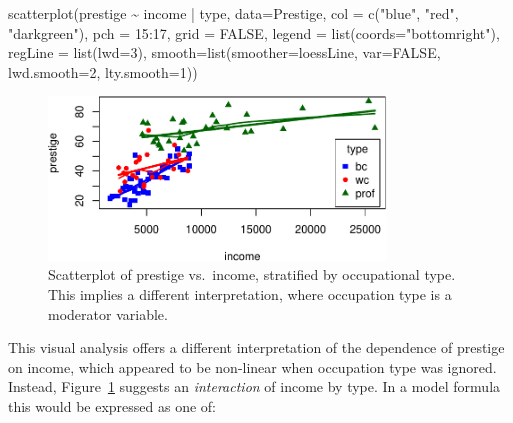 \documentclass[
  letterpaper,
  10pt,
  krantz2]{krantz}
\makeatletter
\newenvironment{Shaded}{\begin{snugshade}}{\end{snugshade}}
\newcommand{\AttributeTok}[1]{\textcolor[rgb]{0.40,0.45,0.13}{#1}}
\newcommand{\ConstantTok}[1]{\textcolor[rgb]{0.56,0.35,0.01}{#1}}
\newcommand{\DecValTok}[1]{\textcolor[rgb]{0.68,0.00,0.00}{#1}}
\newcommand{\FunctionTok}[1]{\textcolor[rgb]{0.28,0.35,0.67}{#1}}
\newcommand{\NormalTok}[1]{\textcolor[rgb]{0.00,0.23,0.31}{#1}}
\newcommand{\SpecialCharTok}[1]{\textcolor[rgb]{0.37,0.37,0.37}{#1}}
\newcommand{\StringTok}[1]{\textcolor[rgb]{0.13,0.47,0.30}{#1}}
\newenvironment{kframe}{%
  \medskip{}
  \setlength{\fboxsep}{.8em}
  \def\at@end@of@kframe{}%
  \ifinner\ifhmode%
  \def\at@end@of@kframe{\end{minipage}}%
  \begin{minipage}{\columnwidth}%
  \fi\fi%
  \def\FrameCommand##1{\hskip\@totalleftmargin \hskip-\fboxsep
  \colorbox{shadecolor}{##1}\hskip-\fboxsep
      \hskip-\linewidth \hskip-\@totalleftmargin \hskip\columnwidth}%
  \MakeFramed {\advance\hsize-\width
    \@totalleftmargin\z@ \linewidth\hsize
    \@setminipage}}%
{\par\unskip\endMakeFramed%
  \at@end@of@kframe}
\renewenvironment{Shaded}{\begin{kframe}}{\end{kframe}}
\makeatother
\begin{document}
\begin{Shaded}
\begin{Highlighting}[]
\FunctionTok{scatterplot}\NormalTok{(prestige }\SpecialCharTok{\textasciitilde{}}\NormalTok{ income }\SpecialCharTok{|}\NormalTok{ type, }\AttributeTok{data=}\NormalTok{Prestige,}
  \AttributeTok{col =} \FunctionTok{c}\NormalTok{(}\StringTok{"blue"}\NormalTok{, }\StringTok{"red"}\NormalTok{, }\StringTok{"darkgreen"}\NormalTok{),}
  \AttributeTok{pch =} \DecValTok{15}\SpecialCharTok{:}\DecValTok{17}\NormalTok{,}
  \AttributeTok{grid =} \ConstantTok{FALSE}\NormalTok{,}
  \AttributeTok{legend =} \FunctionTok{list}\NormalTok{(}\AttributeTok{coords=}\StringTok{"bottomright"}\NormalTok{),}
  \AttributeTok{regLine =} \FunctionTok{list}\NormalTok{(}\AttributeTok{lwd=}\DecValTok{3}\NormalTok{),}
  \AttributeTok{smooth=}\FunctionTok{list}\NormalTok{(}\AttributeTok{smoother=}\NormalTok{loessLine, }
              \AttributeTok{var=}\ConstantTok{FALSE}\NormalTok{, }\AttributeTok{lwd.smooth=}\DecValTok{2}\NormalTok{, }\AttributeTok{lty.smooth=}\DecValTok{1}\NormalTok{))}
\end{Highlighting}
\end{Shaded}

\begin{figure}[H]

{\centering \includegraphics[width=0.8\textwidth,height=\textheight]{figs/ch03/fig-Prestige-scatterplot3-1.pdf}

}

\caption{\label{fig-Prestige-scatterplot3}Scatterplot of prestige
vs.~income, stratified by occupational type. This implies a different
interpretation, where occupation type is a moderator variable.}

\end{figure}

This visual analysis offers a different interpretation of the dependence
of prestige on income, which appeared to be non-linear when occupation
type was ignored. Instead, Figure~\ref{fig-Prestige-scatterplot3}
suggests an \emph{interaction} of income by type. In a model formula
this would be expressed as one of:
\end{document}
